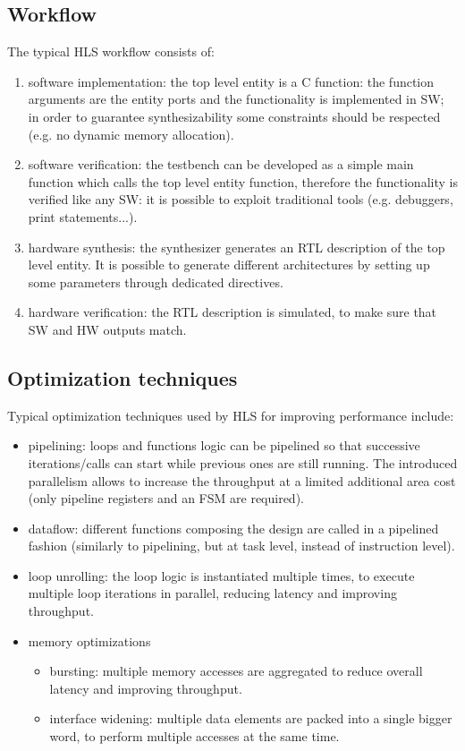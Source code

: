 \documentclass[11pt,a4paper]{memoir}
\begin{document}
\subsection{Workflow}
The typical HLS workflow consists of:
\begin{enumerate}
	\item software implementation: the top level entity is a C function:
		the function arguments are the entity ports and the functionality
		is implemented in SW; in order to guarantee synthesizability
		some constraints should be respected (e.g. no dynamic memory
		allocation).
	\item software verification: the testbench can be developed as a simple
		main function which calls the top level entity function,
		therefore the functionality is verified like any SW:
		it is possible to exploit traditional tools (e.g. debuggers,
		print statements...).
	\item hardware synthesis: the synthesizer generates an RTL description
		of the top level entity. It is possible to generate different
		architectures by setting up some parameters through dedicated
		directives.
	\item hardware verification: the RTL description is simulated, to make
		sure that SW and HW outputs match.
\end{enumerate}

\subsection{Optimization techniques}
Typical optimization techniques used by HLS for improving performance include:
\begin{itemize}
	\item pipelining: loops and functions logic can be pipelined so that
		successive iterations/calls can start while previous ones are
		still running. The introduced parallelism allows to increase
		the throughput at a limited additional area cost (only pipeline
		registers and an FSM are required).
	\item dataflow: different functions composing the design are called in
		a pipelined fashion (similarly to pipelining, but at task level,
		instead of instruction level).
	\item loop unrolling: the loop logic is instantiated multiple times,
		to execute multiple loop iterations in parallel, reducing latency
		and improving throughput.
	\item memory optimizations
		\begin{itemize}
			\item bursting: multiple memory accesses are aggregated
				to reduce overall latency and improving throughput.
			\item interface widening: multiple data elements are
				packed into a single bigger word, to perform
				multiple accesses at the same time.
		\end{itemize}
\end{itemize}
\end{document}
